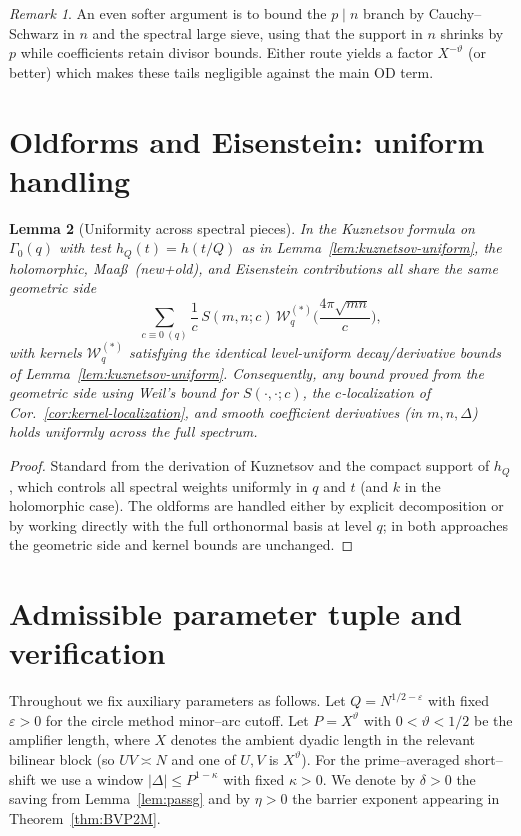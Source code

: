 \documentclass[11pt]{article}
\newtheorem{lemma}{Lemma}[part]
\theoremstyle{definition}
\theoremstyle{remark}
\newtheorem{remark}[lemma]{Remark}
\numberwithin{equation}{part}
\begin{document}
\begin{remark}
	An even softer argument is to bound the $p\mid n$ branch by Cauchy--Schwarz in $n$ and the spectral large sieve, using that the support in $n$ shrinks by $p$ while coefficients retain divisor bounds. Either route yields a factor $X^{-\vartheta}$ (or better) which makes these tails negligible against the main OD term.
\end{remark}

\section{Oldforms and Eisenstein: uniform handling}\label{sec:old-eis}

\begin{lemma}[Uniformity across spectral pieces]\label{lem:oldforms-eis-uniform}
	In the Kuznetsov formula on $\Gamma_0(q)$ with test $h_Q(t)=h(t/Q)$ as in Lemma~\ref{lem:kuznetsov-uniform},
	the holomorphic, Maa\ss\ (new+old), and Eisenstein contributions all share the same geometric side
	\[
		\sum_{c\equiv 0\ (q)} \frac{1}{c}\,S(m,n;c)\,\mathcal W_q^{(*)}\!\Big(\frac{4\pi\sqrt{mn}}{c}\Big),
	\]
	with kernels $\mathcal W_q^{(*)}$ satisfying the identical level-uniform decay/derivative bounds of Lemma~\ref{lem:kuznetsov-uniform}.
	Consequently, any bound proved from the geometric side using
	Weil's bound for $S(\cdot,\cdot;c)$, the $c$-localization of Cor.~\ref{cor:kernel-localization},
	and smooth coefficient derivatives (in $m,n,\Delta$) holds \emph{uniformly} across the full spectrum.
\end{lemma}

\begin{proof}
	Standard from the derivation of Kuznetsov and the compact support of $h_Q$, which controls all spectral weights uniformly in $q$ and $t$ (and $k$ in the holomorphic case). The oldforms are handled either by explicit decomposition or by working directly with the full orthonormal basis at level $q$; in both approaches the geometric side and kernel bounds are unchanged.
\end{proof}

\section{Admissible parameter tuple and verification}
\label{app:parameters}

Throughout we fix auxiliary parameters as follows. Let $Q=N^{1/2-\varepsilon}$ with fixed $\varepsilon>0$ for the circle method minor–arc cutoff. Let $P=X^{\vartheta}$ with $0<\vartheta<1/2$ be the amplifier length, where $X$ denotes the ambient dyadic length in the relevant bilinear block (so $UV\asymp N$ and one of $U,V$ is $X^{\vartheta}$). For the prime–averaged short–shift we use a window $|\Delta|\le P^{1-\kappa}$ with fixed $\kappa>0$. We denote by $\delta>0$ the saving from Lemma~\ref{lem:passg} and by $\eta>0$ the barrier exponent appearing in Theorem~\ref{thm:BVP2M}.
\end{document}
